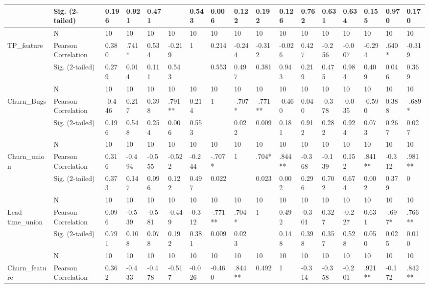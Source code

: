 \documentclass[UKenglish]{ifimaster}  %
\begin{document}
\begin{table}[!htbp]
\begin{adjustwidth}{-2.5cm}{}
{\begin{tabular}{ | l | l | l | l | l | l | l | l | l | l | l | l | l | l | l | l | l | }
	 & Sig. (2-tailed) & 0.196 & 0.921 & 0.471 &  & 0.543 & 0.006 & 0.122 & 0.192 & 0.126 & 0.762 & 0.631 & 0.634 & 0.155 & 0.970 & 0.170\\ \hline
	 & N & 10 & 10 & 10 & 10 & 10 & 10 & 10 & 10 & 10 & 10 & 10 & 10 & 10 & 10 & 10 \\ \hline
	TP\_feature & Pearson Correlation & 0.380 & .741* & 0.534 & -0.219 & 1 & 0.214 & -0.244 & -0.312 & -0.026 & 0.427 & -0.256 & -0.007 & -0.294 & .640* & -0.319\\ \hline
	 & Sig. (2-tailed) & 0.279 & 0.014 & 0.111 & 0.543 &  & 0.553 & 0.497 & 0.381 & 0.943 & 0.219 & 0.475 & 0.984 & 0.409 & 0.046 & 0.369\\ \hline
	 & N & 10 & 10 & 10 & 10 & 10 & 10 & 10 & 10 & 10 & 10 & 10 & 10 & 10 & 10 & 10 \\ \hline
	Churn\_Bugs & Pearson Correlation & -0.446 & 0.217 & 0.398 & .791** & 0.214 & 1 & -.707* & -.771** & -0.460 & 0.040 & -0.378 & -0.035 & -0.590 & 0.388 & -.689* \\ \hline
	 & Sig. (2-tailed) & 0.196 & 0.548 & 0.254 & 0.006 & 0.553 &  & 0.022 & 0.009 & 0.181 & 0.912 & 0.282 & 0.924 & 0.073 & 0.267 & 0.027\\ \hline
	 & N & 10 & 10 & 10 & 10 & 10 & 10 & 10 & 10 & 10 & 10 & 10 & 10 & 10 & 10 & 10 \\ \hline
	Churn\_union & Pearson Correlation & 0.316 & -0.494 & -0.555 & -0.522 & -0.244 & -.707* & 1 & .704* & .844** & -0.368 & -0.139 & 0.152 & .841** & -0.312 & .981** \\ \hline
	 & Sig. (2-tailed) & 0.373 & 0.147 & 0.096 & 0.122 & 0.497 & 0.022 &  & 0.023 & 0.002 & 0.296 & 0.702 & 0.674 & 0.002 & 0.379 & 0\\ \hline
	 & N & 10 & 10 & 10 & 10 & 10 & 10 & 10 & 10 & 10 & 10 & 10 & 10 & 10 & 10 & 10 \\ \hline
	Lead time\_union & Pearson Correlation & 0.096 & -0.539 & -0.581 & -0.449 & -0.312 & -.771** & .704* & 1 & 0.492 & -0.301 & 0.327 & -0.227 & 0.631 & -.697* & .766** \\ \hline
	 & Sig. (2-tailed) & 0.791 & 0.108 & 0.078 & 0.192 & 0.381 & 0.009 & 0.023 &  & 0.148 & 0.398 & 0.357 & 0.528 & 0.050 & 0.025 & 0.010\\ \hline
	 & N & 10 & 10 & 10 & 10 & 10 & 10 & 10 & 10 & 10 & 10 & 10 & 10 & 10 & 10 & 10 \\ \hline
	Churn\_feature & Pearson Correlation & 0.362 & -0.433 & -0.478 & -0.517 & -0.026 & -0.460 & .844** & 0.492 & 1 & -0.314 & -0.358 & -0.201 & .921** & -0.172 & .842** \\ \hline

\end{tabular}}
\end{adjustwidth}
\end{table}
\end{document}
